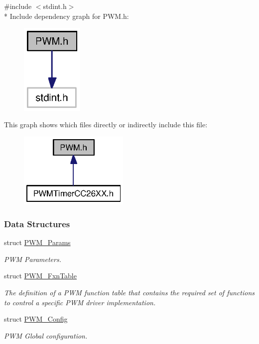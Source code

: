 {\ttfamily \#include $<$stdint.\+h$>$}\\*
Include dependency graph for P\+W\+M.\+h\+:
\nopagebreak
\begin{figure}[H]
\begin{center}
\leavevmode
\includegraphics[width=85pt]{_p_w_m_8h__incl}
\end{center}
\end{figure}
This graph shows which files directly or indirectly include this file\+:
\nopagebreak
\begin{figure}[H]
\begin{center}
\leavevmode
\includegraphics[width=149pt]{_p_w_m_8h__dep__incl}
\end{center}
\end{figure}
\subsubsection*{Data Structures}
\begin{DoxyCompactItemize}
\item 
struct \hyperlink{struct_p_w_m___params}{P\+W\+M\+\_\+\+Params}
\begin{DoxyCompactList}\small\item\em P\+W\+M Parameters. \end{DoxyCompactList}\item 
struct \hyperlink{struct_p_w_m___fxn_table}{P\+W\+M\+\_\+\+Fxn\+Table}
\begin{DoxyCompactList}\small\item\em The definition of a P\+W\+M function table that contains the required set of functions to control a specific P\+W\+M driver implementation. \end{DoxyCompactList}\item 
struct \hyperlink{struct_p_w_m___config}{P\+W\+M\+\_\+\+Config}
\begin{DoxyCompactList}\small\item\em P\+W\+M Global configuration. \end{DoxyCompactList}\end{DoxyCompactItemize}
